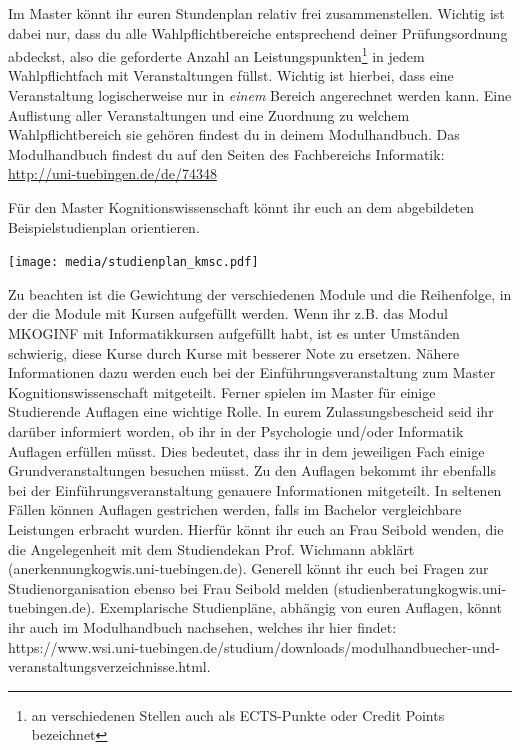 Im Master könnt ihr euren Stundenplan relativ frei zusammenstellen.
Wichtig ist dabei nur, dass du alle Wahlpflichtbereiche entsprechend deiner Prüfungsordnung abdeckst,
also die geforderte Anzahl an Leistungspunkten\footnote{an verschiedenen Stellen auch als ECTS-Punkte oder Credit Points bezeichnet}
in jedem Wahlpflichtfach mit Veranstaltungen füllst. Wichtig ist hierbei, dass eine Veranstaltung logischerweise nur in \emph{einem} Bereich angerechnet
werden kann.
Eine Auflistung aller Veranstaltungen und eine Zuordnung zu welchem Wahlpflichtbereich sie gehören
findest du in deinem Modulhandbuch. Das Modulhandbuch findest du auf den Seiten des Fachbereichs Informatik: \\ 
\url{http://uni-tuebingen.de/de/74348}

\ifkogwiss
Für den Master Kognitionswissenschaft könnt ihr euch an dem abgebildeten Beispielstudienplan orientieren.
\begin{center}
	\texttt{[image: media/studienplan\_kmsc.pdf]}
\end{center}
Zu beachten ist die Gewichtung der verschiedenen Module und die Reihenfolge, in der die Module mit Kursen aufgefüllt werden. Wenn
ihr z.B. das Modul MKOGINF mit Informatikkursen aufgefüllt habt, ist es unter Umständen schwierig, diese Kurse durch Kurse mit
besserer Note zu ersetzen. Nähere Informationen dazu werden euch bei der Einführungsveranstaltung zum Master Kognitionswissenschaft mitgeteilt. Ferner spielen im Master für einige Studierende Auflagen eine wichtige Rolle. In eurem Zulassungsbescheid seid ihr darüber informiert worden, ob ihr in der Psychologie und/oder Informatik Auflagen erfüllen müsst. Dies bedeutet, dass ihr in dem jeweiligen Fach einige Grundveranstaltungen besuchen müsst. Zu den Auflagen bekommt ihr ebenfalls bei der Einführungsveranstaltung genauere Informationen mitgeteilt. In seltenen Fällen können Auflagen gestrichen werden, falls im Bachelor vergleichbare Leistungen erbracht wurden. Hierfür könnt ihr euch an Frau Seibold wenden, die die Angelegenheit mit dem Studiendekan Prof. Wichmann abklärt (anerkennung\At kogwis.uni-tuebingen.de). Generell könnt ihr euch bei Fragen zur Studienorganisation ebenso bei Frau Seibold melden (studienberatung\At kogwis.uni-tuebingen.de). Exemplarische Studienpläne, abhängig von euren Auflagen, könnt ihr auch im Modulhandbuch nachsehen, welches ihr hier findet: https://www.wsi.uni-tuebingen.de/studium/downloads/modulhandbuecher-und-veranstaltungsverzeichnisse.html.
\fi

